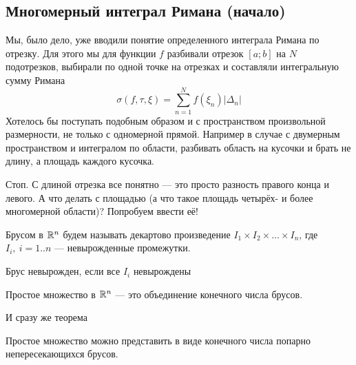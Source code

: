 	\subsection{Многомерный интеграл Римана (начало)}
	Мы, было дело, уже вводили понятие определенного интеграла Римана по отрезку. Для этого мы для функции $f$ разбивали отрезок $[a; b]$ на $N$ подотрезков, выбирали по одной точке на отрезках и составляли интегральную сумму Римана
	$$
		\sigma(f, \tau, \xi) = \sum\limits_{n =1}^{N}f(\xi_n)|\Delta_n|
	$$
	Хотелось бы поступать подобным образом и с пространством произвольной размерности, не только с одномерной прямой. Например в случае с двумерным пространством и интегралом по области, разбивать область на кусочки и брать не длину, а площадь каждого кусочка. 
	\par Стоп. С длиной отрезка все понятно --- это просто разность правого конца и левого. А что делать с площадью (а что такое площадь четырёх- и более многомерной области)? Попробуем ввести её!
	\begin{Def}
		Брусом в $\mathbb{R}^n$ будем называть декартово произведение $I_1\times I_2\times\ldots \times I_n$, где $I_i,\ i = 1..n$ --- невырожденные промежутки.
	\end{Def}
	Брус невырожден, если все $I_i$ невырождены
	\begin{Def}
		Простое множество в $\mathbb{R}^n$ --- это объединение конечного числа брусов. 
	\end{Def}
	И сразу же теорема
	\begin{Theorem}
		Простое множество можно представить в виде конечного числа попарно непересекающихся брусов.
	\end{Theorem} 
